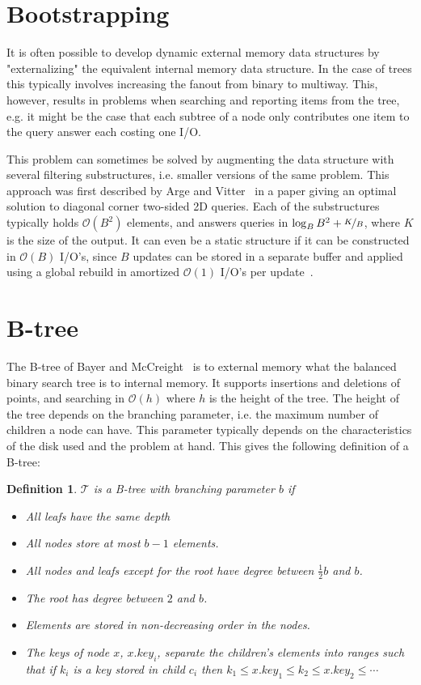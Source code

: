 \documentclass[twoside,11pt,openright]{report}
\newtheorem{definition}{Definition}
\begin{document}
\section{Bootstrapping}
It is often possible to develop dynamic external memory data structures by "externalizing" the equivalent internal memory data structure. In the case of trees this typically involves increasing the fanout from binary to multiway. This, however, results in problems when searching and reporting items from the tree, e.g. it might be the case that each subtree of a node only contributes one item to the query answer each costing one I/O.

This problem can sometimes be solved by augmenting the data structure with several filtering substructures, i.e. smaller versions of the same problem. This approach was first described by Arge and Vitter~\cite{arge_vitter_2003} in a paper giving an optimal solution to diagonal corner two-sided 2D queries. Each of the substructures typically holds $\mathcal{O}(B^2)$ elements, and answers queries in $\log_B B^2 + \nicefrac{K}{B}$, where $K$ is the size of the output. It can even be a static structure if it can be constructed in $\mathcal{O}(B)$ I/O's, since $B$ updates can be stored in a separate buffer and applied using a global rebuild in amortized $\mathcal{O}(1)$ I/O's per update~\cite{vitter_2008}.

\section{B-tree}
\label{sec:prelim_b_tree}
The B-tree of Bayer and McCreight~\cite{bayer_mccreight_1972} is to external memory what the balanced binary search tree is to internal memory. It supports insertions and deletions of points, and searching in $\mathcal{O}(h)$ where $h$ is the height of the tree. The height of the tree depends on the branching parameter, i.e. the maximum number of children a node can have. This parameter typically depends on the characteristics of the disk used and the problem at hand. 
This gives the following definition of a B-tree:

\begin{definition}
\label{def:btree}
$\mathcal{T}$ is a B-tree with branching parameter $b$ if
\begin{itemize}
	\item All leafs have the same depth
	\item All nodes store at most $b-1$ elements.
	\item All nodes and leafs except for the root have degree between $\frac{1}{2}b$ and $b$.
	\item The root has degree between $2$ and $b$.
	\item Elements are stored in non-decreasing order in the nodes.
	\item The keys of node $x$, $x.key_i$, separate the children's elements into ranges such that if $k_i$ is a key stored in child $c_i$ then $k_1 \leq x.key_1 \leq k_2 \leq x.key_2 \leq \cdots$
\end{itemize}
\end{definition}
\end{document}
